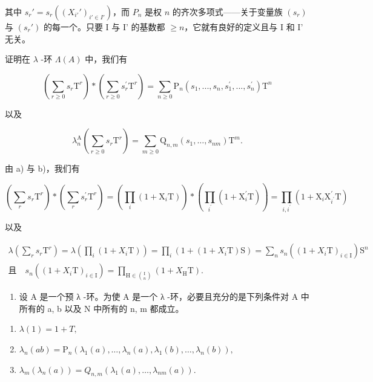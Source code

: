 其中 \(s_r' = s_r((X_{i'}')_{i'\in I'})\)，而 \(P_n\) 是权 \(n\) 的齐次多项式——关于变量族 \((s_r)\) 与 \((s_r')\) 的每一个。只要 I 与 I' 的基数都 \(\geqslant n\)，它就有良好的定义且与 I 和 I' 无关。

证明在 \(\lambda\) -环 \(\Lambda(A)\) 中，我们有

\[
\left(\sum_ {r \geqslant 0} s _ {r} \mathrm{T} ^ {r}\right) * \left(\sum_ {r \geqslant 0} s _ {r} ^ {\prime} \mathrm{T} ^ {r}\right) = \sum_ {n \geqslant 0} \mathrm{P} _ {n} (s _ {1},..., s _ {n}, s _ {1} ^ {\prime},..., s _ {n} ^ {\prime}) \mathrm{T} ^ {n}
\]

以及

\[
\lambda_ {n} ^ {\mathrm{A}} \left(\sum_ {r \geqslant 0} s _ {r} \mathrm{T} ^ {r}\right) = \sum_ {m \geqslant 0} \mathrm{Q} _ {n, m} \left(s _ {1}, \dots , s _ {n m}\right) \mathrm{T} ^ {m}.
\]

由 a) 与 b)，我们有

\[
\left(\sum_ {r} s _ {r} \mathrm{T} ^ {r}\right) * \left(\sum_ {r} s _ {r} ^ {\prime} \mathrm{T} ^ {r}\right) = \left(\prod_ {i} \left(1 + \mathrm{X} _ {i} \mathrm{T}\right)\right) * \left(\prod_ {i ^ {\prime}} \left(1 + \mathrm{X} _ {i} ^ {\prime} \mathrm{T}\right)\right) = \prod_ {i, i ^ {\prime}} \left(1 + \mathrm{X} _ {i} \mathrm{X} _ {i ^ {\prime}} ^ {\prime} \mathrm{T}\right)
\]

以及

\[
\begin{array}{l} \lambda (\sum_ {r} s _ {r} \mathrm{T} ^ {r}) = \lambda (\prod _{i} (1 + X _ {i} \mathrm{T})) = \prod _{i} (1 + (1 + X _ {i} \mathrm{T}) \mathrm{S}) = \sum _{n} s _ {n} ((1 + X _ {i} \mathrm{T}) _ {i \in \mathrm{I}}) \mathrm{S} ^ {n} \\ \text{且}\quad s _ {n} ((1 + X _ {i} \mathrm{T}) _ {i \in \mathrm{I}}) = \prod _{\mathrm{H} \in \binom {\mathrm{I}} {n}} (1 + X _{\mathrm{H}} \mathrm{T}) . \end{array}
\]

\begin{enumerate}
\def\labelenumi{\alph{enumi})}
\setcounter{enumi}{4}
\tightlist
\item
  设 A 是一个预 λ -环。为使 A 是一个 λ -环，必要且充分的是下列条件对 A 中所有的 a, b 以及 N 中所有的 n, m 都成立。
\end{enumerate}

\begin{enumerate}
\def\labelenumi{(\roman{enumi})}
\item
  \(\lambda(1) = 1 + T,\)
\item
  \(\lambda_{n}(ab) = \mathrm{P}_{n}(\lambda_{1}(a),\dots,\lambda_{n}(a),\lambda_{1}(b),\dots,\lambda_{n}(b)),\)
\item
  \(\lambda_{m}(\lambda_{n}(a)) = Q_{n,m}(\lambda_{1}(a),\dots,\lambda_{nm}(a)).\)
\end{enumerate}

